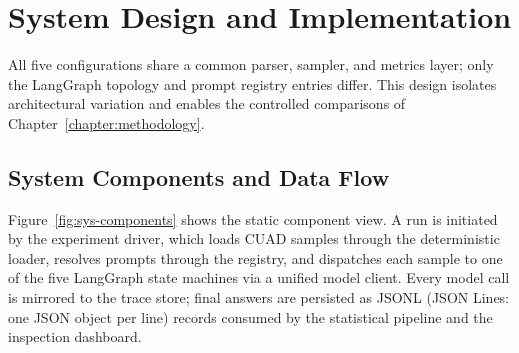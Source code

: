
\chapter{System Design and Implementation}\label{chapter:system-design}

All five configurations share a common parser, sampler, and metrics layer; only the
LangGraph topology and prompt registry entries differ. This design isolates
architectural variation and enables the controlled comparisons of
Chapter~\ref{chapter:methodology}.

\section{System Components and Data Flow}\label{sec:sys:components}

Figure~\ref{fig:sys-components} shows the static component view. A run is initiated
by the experiment driver, which loads CUAD samples through the deterministic loader,
resolves prompts through the registry, and dispatches each sample to one of the five
LangGraph state machines via a unified model client. Every model call is mirrored to
the trace store; final answers are persisted as JSONL (JSON Lines: one JSON object per
line) records consumed by the
statistical pipeline and the inspection dashboard.

